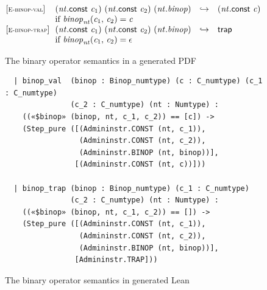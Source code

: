 \begin{figure}[t]
\small
$$
\begin{array}{@{}l@{}lcl}
{[\textsc{\scriptsize E{-}binop{-}val}]} \ \
 & (\mathit{nt}.\mathsf{const}~\mathit{c}_{1})~(\mathit{nt}.\mathsf{const}~\mathit{c}_{2})~(\mathit{nt} . \mathit{binop})
 &\hookrightarrow& (\mathit{nt}.\mathsf{const}~\mathit{c}) \\
%
& \mbox{if}~{{{\mathit{binop}}{}}_{\mathit{nt}}}{(\mathit{c}_{1},\, \mathit{c}_{2})} = \mathit{c} \\
%
{[\textsc{\scriptsize E{-}binop{-}trap}]} \ \
 & (\mathit{nt}.\mathsf{const}~\mathit{c}_{1})~(\mathit{nt}.\mathsf{const}~\mathit{c}_{2})~(\mathit{nt} . \mathit{binop})
 &\hookrightarrow& \mathsf{trap} \\
%
& \mbox{if}~{{{\mathit{binop}}{}}_{\mathit{nt}}}{(\mathit{c}_{1},\, \mathit{c}_{2})} = \epsilon
\end{array}
$$
\vspace*{-1em}
\caption{The binary operator semantics in a generated PDF}
\label{fig:latex}
\end{figure}

\begin{figure}[t]
\footnotesize
\begin{verbatim}
  | binop_val  (binop : Binop_numtype) (c : C_numtype) (c_1 : C_numtype)
               (c_2 : C_numtype) (nt : Numtype) : 
    ((«$binop» (binop, nt, c_1, c_2)) == [c]) -> 
    (Step_pure ([(Admininstr.CONST (nt, c_1)),
                 (Admininstr.CONST (nt, c_2)),
                 (Admininstr.BINOP (nt, binop))],
                [(Admininstr.CONST (nt, c))]))

  | binop_trap (binop : Binop_numtype) (c_1 : C_numtype)
               (c_2 : C_numtype) (nt : Numtype) : 
    ((«$binop» (binop, nt, c_1, c_2)) == []) -> 
    (Step_pure ([(Admininstr.CONST (nt, c_1)),
                 (Admininstr.CONST (nt, c_2)),
                 (Admininstr.BINOP (nt, binop))],
                [Admininstr.TRAP]))
\end{verbatim}
\caption{The binary operator semantics in generated Lean}
\label{fig:lean}
\end{figure}